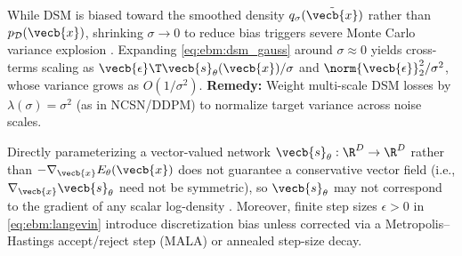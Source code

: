 \documentclass[../../../../master.tex]{subfiles}
\begin{document}
\begin{pitfall}
While DSM is biased toward the smoothed density $q_\sigma(\tilde{\vecb{x}})$ rather than $p_{\mathcal{D}}(\vecb{x})$, shrinking $\sigma \to 0$ to reduce bias triggers severe Monte Carlo variance explosion . Expanding \eqref{eq:ebm:dsm_gauss} around $\sigma \approx 0$ yields cross-terms scaling as $\vecb{\epsilon}\T \vecb{s}_\theta(\vecb{x}) / \sigma$ and $\norm{\vecb{\epsilon}}_2^2 / \sigma^2$, whose variance grows as $O(1/\sigma^2)$. \textbf{Remedy:} Weight multi-scale DSM losses by $\lambda(\sigma) = \sigma^2$ (as in NCSN/DDPM) to normalize target variance across noise scales.
\end{pitfall}

\begin{pitfall}
Directly parameterizing a vector-valued network $\vecb{s}_\theta : \R^D \to \R^D$ rather than $-\nabla_{\vecb{x}} E_\theta(\vecb{x})$ does not guarantee a conservative vector field (i.e., $\nabla_{\vecb{x}} \vecb{s}_\theta$ need not be symmetric), so $\vecb{s}_\theta$ may not correspond to the gradient of any scalar log-density . Moreover, finite step sizes $\epsilon > 0$ in \eqref{eq:ebm:langevin} introduce discretization bias unless corrected via a Metropolis--Hastings accept/reject step (MALA) or annealed step-size decay.
\end{pitfall}
\end{document}
